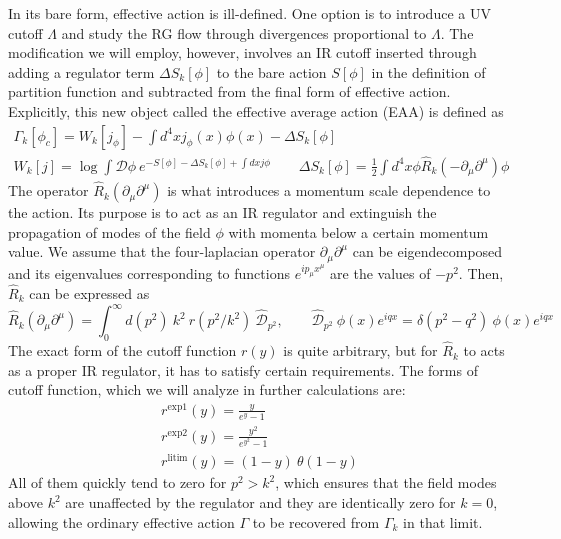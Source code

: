\documentclass[11pt, a4paper]{article}
\begin{document}
In its bare form, effective action is ill-defined. One option is to introduce a UV cutoff $\Lambda$
and study the RG flow through divergences proportional to $\Lambda$. The modification we will employ, however, involves
an IR cutoff inserted through adding a regulator term $\Delta S_k[\phi]$ to the bare action $S[\phi]$ in the definition of partition function
and subtracted from the final form of effective action. Explicitly, this new object called the effective average action (EAA) is defined as
\begin{gather}
    \Gamma_k[\phi_c] = W_k[j_\phi] - \int d^4 x j_\phi(x) \phi(x) - \Delta S_k[\phi]\\
    W_k[j] = \log{\int \mathcal{D}\phi \ e^{-S[\phi] - \Delta S_k[\phi] + \int dx j \phi}} \qquad \Delta S_k[\phi] = \frac{1}{2}\int d^4 x \phi \hat{R}_k (-\partial_{\mu}\partial^{\mu}) \phi
\end{gather}
The operator $\hat{R}_k (\partial_{\mu}\partial^{\mu})$ is what introduces a momentum scale dependence to the action.
Its purpose is to act as an IR regulator and extinguish the propagation of modes of the field $\phi$ with momenta below a certain momentum value.
We assume that the four-laplacian operator $\partial_{\mu}\partial^{\mu}$ can be eigendecomposed and its eigenvalues corresponding to functions $e^{ip_\mu x^\mu}$ are the values of $-p^2$.
Then, $\hat{R}_k$ can be expressed as
\begin{equation}
    \hat{R}_k (\partial_{\mu}\partial^{\mu}) = \int_0^{\infty} d(p^2) \ k^2 \ r(p^2/k^2) \ \hat{\mathcal{D}}_{p^2}, \qquad \hat{\mathcal{D}}_{p^2} \ \phi(x) e^{i q x} = \delta(p^2-q^2) \ \phi(x) e^{i q x}
\end{equation}
The exact form of the cutoff function $r(y)$ is quite arbitrary, but for $\hat{R}_k$ to acts as a proper IR regulator, it has to satisfy certain requirements.
The forms of cutoff function, which we will analyze in further calculations are:
\begin{gather}
    r^{\text{exp1}}(y) = \frac{y}{e^{y} - 1}\\
    r^{\text{exp2}}(y) = \frac{y^2}{e^{y^2} - 1}\\
    r^{\text{litim}}(y) = (1-y) \ \theta \left(1-y\right)
    \label{litim}
\end{gather}
All of them quickly tend to zero for $p^2 > k^2$, which ensures that the field modes above $k^2$ are unaffected by the regulator
and they are identically zero for $k = 0$, allowing the ordinary effective action $\Gamma$ to be recovered from $\Gamma_k$ in that limit.
\end{document}
